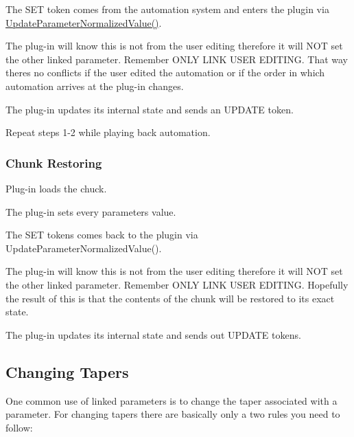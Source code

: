 \begin{DoxyEnumerate}
\item The S\+ET token comes from the automation system and enters the plugin via \mbox{\hyperlink{a01669_a685858711efb8634ce66c327f2865c71}{Update\+Parameter\+Normalized\+Value()}}.
\begin{DoxyItemize}
\item The plug-\/in will know this is not from the user editing therefore it will N\+OT set the other linked parameter. Remember O\+N\+LY L\+I\+NK U\+S\+ER E\+D\+I\+T\+I\+NG. That way there\textquotesingle{}s no conflicts if the user edited the automation or if the order in which automation arrives at the plug-\/in changes.
\end{DoxyItemize}
\item The plug-\/in updates its internal state and sends an U\+P\+D\+A\+TE token.
\item Repeat steps 1-\/2 while playing back automation.
\end{DoxyEnumerate}\hypertarget{a00824_linkedParameters_linkedParameterOperation_chunkRestoring}{}\subsubsection{Chunk Restoring}\label{a00824_linkedParameters_linkedParameterOperation_chunkRestoring}

\begin{DoxyEnumerate}
\item Plug-\/in loads the chuck.
\item The plug-\/in sets every parameters value.
\item The S\+ET tokens comes back to the plugin via Update\+Parameter\+Normalized\+Value().
\begin{DoxyItemize}
\item The plug-\/in will know this is not from the user editing therefore it will N\+OT set the other linked parameter. Remember O\+N\+LY L\+I\+NK U\+S\+ER E\+D\+I\+T\+I\+NG. Hopefully the result of this is that the contents of the chunk will be restored to its exact state.
\end{DoxyItemize}
\item The plug-\/in updates its internal state and sends out U\+P\+D\+A\+TE tokens.
\end{DoxyEnumerate}\hypertarget{a00824_linkedParameters_changingTapers}{}\subsection{Changing Tapers}\label{a00824_linkedParameters_changingTapers}
One common use of linked parameters is to change the taper associated with a parameter. For changing tapers there are basically only a two rules you need to follow\+:


